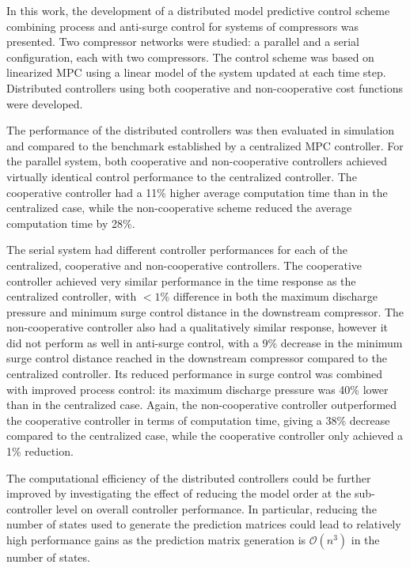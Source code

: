 \label{sec:conclusion}

In this work, the development of a distributed model predictive control scheme combining process and anti-surge control for systems of compressors was presented.
Two compressor networks were studied: a parallel and a serial configuration, each with two compressors.
The control scheme was based on linearized MPC using a linear model of the system updated at each time step.
Distributed controllers using both cooperative and non-cooperative cost functions were developed.

The performance of the distributed controllers was then evaluated in simulation and compared to the benchmark established by a centralized MPC controller.
For the parallel system, both cooperative and non-cooperative controllers achieved virtually identical control performance to the centralized controller.
The cooperative controller had a 11\% higher average computation time than in the centralized case, while the non-cooperative scheme reduced the average computation time by 28\%.

The serial system had different controller performances for each of the centralized, cooperative and non-cooperative controllers.
The cooperative controller achieved very similar performance in the time response as the centralized controller, with $<1\%$ difference in both the maximum discharge pressure and minimum surge control distance in the downstream compressor.
The non-cooperative controller also had a qualitatively similar response, however it did not perform as well in anti-surge control, with a 9\% decrease in the minimum surge control distance reached in the downstream compressor compared to the centralized controller.
Its reduced performance in surge control was combined with improved process control: its maximum discharge pressure was 40\% lower than in the centralized case.
Again, the non-cooperative controller outperformed the cooperative controller in terms of computation time, giving a 38\% decrease compared to the centralized case, while the cooperative controller only achieved a 1\% reduction.  

The computational efficiency of the distributed controllers could be further improved by investigating the effect of reducing the model order at the sub-controller level on overall controller performance.
In particular, reducing the number of states used to generate the prediction matrices could lead to relatively high performance gains as the prediction matrix generation is $\mathcal{O}(n^3)$ in the number of states.

